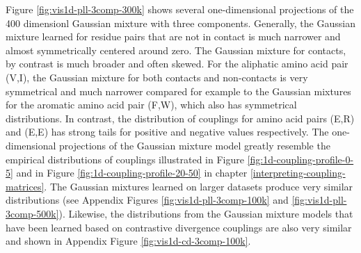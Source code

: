 \documentclass[11pt,a4paper,twoside]{book}
\theoremstyle{definition}
\theoremstyle{definition}
\theoremstyle{remark}
\begin{document}
Figure \ref{fig:vis1d-pll-3comp-300k} shows several one-dimensional
projections of the 400 dimensionl Gaussian mixture with three
components. Generally, the Gaussian mixture learned for residue pairs
that are not in contact is much narrower and almost symmetrically
centered around zero. The Gaussian mixture for contacts, by contrast is
much broader and often skewed. For the aliphatic amino acid pair (V,I),
the Gaussian mixture for both contacts and non-contacts is very
symmetrical and much narrower compared for example to the Gaussian
mixtures for the aromatic amino acid pair (F,W), which also has
symmetrical distributions. In contrast, the distribution of couplings
for amino acid pairs (E,R) and (E,E) has strong tails for positive and
negative values respectively. The one-dimensional projections of the
Gaussian mixture model greatly resemble the empirical distributions of
couplings illustrated in Figure \ref{fig:1d-coupling-profile-0-5} and in
Figure \ref{fig:1d-coupling-profile-20-50} in chapter
\ref{interpreting-coupling-matrices}. The Gaussian mixtures learned on
larger datasets produce very similar distributions (see Appendix Figures
\ref{fig:vis1d-pll-3comp-100k} and \ref{fig:vis1d-pll-3comp-500k}).
Likewise, the distributions from the Gaussian mixture models that have
been learned based on contrastive divergence couplings are also very
similar and shown in Appendix Figure \ref{fig:vis1d-cd-3comp-100k}.
\end{document}
